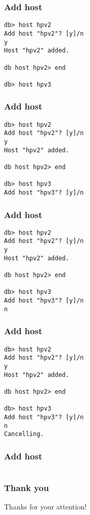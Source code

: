 \documentclass{beamer}
\begin{document}
\begin{frame}[fragile]
\frametitle{Add host}
\begin{lstlisting}
db> host hpv2
Add host "hpv2"? [y]/n
y
Host "hpv2" added.

db host hpv2> end

db> host hpv3
\end{lstlisting}
\end{frame}
\begin{frame}[fragile]
\frametitle{Add host}
\begin{lstlisting}
db> host hpv2
Add host "hpv2"? [y]/n
y
Host "hpv2" added.

db host hpv2> end

db> host hpv3
Add host "hpv3"? [y]/n

\end{lstlisting}
\end{frame}
\begin{frame}[fragile]
\frametitle{Add host}
\begin{lstlisting}
db> host hpv2
Add host "hpv2"? [y]/n
y
Host "hpv2" added.

db host hpv2> end

db> host hpv3
Add host "hpv3"? [y]/n
n
\end{lstlisting}
\end{frame}
\begin{frame}[fragile]
\frametitle{Add host}
\begin{lstlisting}
db> host hpv2
Add host "hpv2"? [y]/n
y
Host "hpv2" added.

db host hpv2> end

db> host hpv3
Add host "hpv3"? [y]/n
n
Cancelling.
\end{lstlisting}
\end{frame}

\begin{frame}[fragile]
\frametitle{Add host}
\begin{lstlisting}

\end{lstlisting}
\end{frame}


\begin{frame}
\frametitle{Thank you}

\center
{\Large Thanks for your attention!}

\end{frame}
\end{document}
